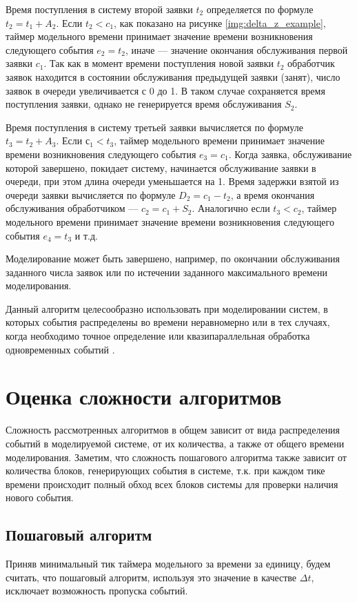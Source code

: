 Время поступления в систему второй заявки $t_2$ определяется по формуле $t_2 = t_1 + A_2$. Если $t_2 < c_1$, как показано на рисунке \ref{img:delta_z_example}, таймер модельного времени принимает значение времени возникновения следующего события $e_2 = t_2$, иначе --- значение окончания обслуживания первой заявки $c_1$. Так как в момент времени поступления новой заявки $t_2$ обработчик заявок находится в состоянии обслуживания предыдущей заявки (занят), число заявок в очереди увеличивается с 0 до 1. В таком случае сохраняется время поступления заявки, однако не генерируется время обслуживания $S_2$. 

Время поступления в систему третьей заявки вычисляется по формуле $t_3 = t_2 + A_3$. Если $с_1 < t_3$, таймер модельного времени принимает значение времени возникновения следующего события $e_3 = c_1$. Когда заявка, обслуживание которой завершено, покидает систему, начинается обслуживание заявки в очереди, при этом длина очереди уменьшается на 1. Время задержки взятой из очереди заявки вычисляется по формуле $D_2 = c_1 - t_2$, а время окончания обслуживания обработчиком --- $c_2 = c_1 + S_2$. Аналогично если $t_3 < c_2$, таймер модельного времени принимает значение времени возникновения следующего события $e_4 = t_3$ и т.д. 

Моделирование может быть завершено, например, по окончании обслуживания заданного числа заявок или по истечении заданного максимального времени моделирования.


Данный алгоритм целесообразно использовать при моделировании систем, в которых события распределены во времени неравномерно или в тех случаях, когда необходимо точное определение или квазипараллельная обработка одновременных событий \cite{imitation_modelling}.

\section{Оценка сложности алгоритмов}
Сложность рассмотренных алгоритмов в общем зависит от вида распределения событий в моделируемой системе, от их количества, а также от общего времени моделирования.
Заметим, что сложность пошагового алгоритма также зависит от количества блоков, генерирующих события в системе, т.к. при каждом тике времени происходит полный обход всех блоков системы для проверки наличия нового события.

\subsection{Пошаговый алгоритм}
Приняв минимальный тик таймера модельного за времени за единицу, будем считать, что пошаговый алгоритм, используя это значение в качестве $\Delta t$, исключает возможность пропуска событий.

